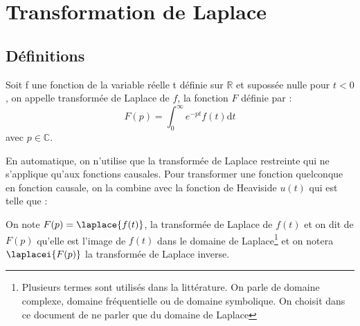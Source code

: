 \chapter{Transformation de Laplace\label{annexe-lap}}


\section{Définitions} 

Soit f une fonction de la variable réelle t définie sur $\mathbb{R}$ 
et supossée  nulle pour $t<0$, on appelle transformée de Laplace de $f$, la fonction $F$ définie par :
$$
F(p) = \int_0^\infty e^{-pt} f(t) \mathrm{d}t
$$
avec $p\in\mathbb{C}$. 

En automatique, on n'utilise que la transformée de Laplace restreinte qui 
ne s'applique qu'aux fonctions causales.
Pour transformer une fonction quelconque en fonction causale, 
on la combine avec la fonction de Heaviside $u(t)$ qui est telle que :



%
%

On note $F(p)=\laplace{f(t)}$, la transformée de Laplace de $f(t)$ et on dit de $F(p)$ qu'elle est l'image de $f(t)$
dans le domaine de Laplace\footnote{Plusieurs termes sont utilisés dans la littérature. On parle 
de domaine complexe, domaine fréquentielle ou de domaine symbolique. On choisit dans ce document 
de ne parler que du domaine de Laplace} et on notera $\laplacei{F(p)}$ la transformée de Laplace inverse.
